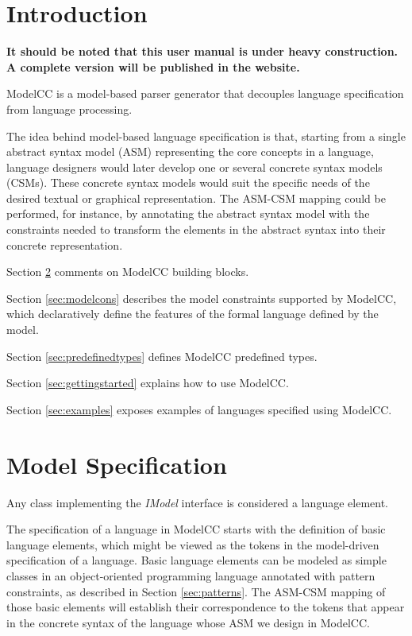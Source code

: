 \documentclass[a4paper,twoside,onecolumn]{article}
\newcommand{\pb}{\newpage}
\newcommand{\empt}{\pb \thispagestyle{empty} \rule[0mm]{0mm}{0mm} \pb}
\begin{document}


\pagestyle{empty}

\tableofcontents

\cleardoublepage

\pagestyle{fancy}

\newpage
\section{Introduction} 

{\bf \color{red} It should be noted that this user manual is under heavy construction. A complete version will be published in the website.}

ModelCC is a model-based parser generator that decouples language specification from language processing.

The idea behind model-based language specification is that, starting from a single abstract syntax model (ASM) representing the core concepts in
a language, language designers would later develop one or several concrete syntax models (CSMs). These concrete syntax models would suit the
specific needs of the desired textual or graphical representation. The ASM-CSM mapping could be performed, for instance, by annotating the
abstract syntax model with the constraints needed to transform the elements in the abstract syntax into their concrete representation.


Section \ref{sec:modelspec} comments on ModelCC building blocks.

Section \ref{sec:modelcons} describes the model constraints supported by ModelCC, which declaratively define the features of the formal language defined by the model.

Section \ref{sec:predefinedtypes} defines ModelCC predefined types.

Section \ref{sec:gettingstarted} explains how to use ModelCC.

Section \ref{sec:examples} exposes examples of languages specified using ModelCC.

\section{Model Specification} \label{sec:modelspec}

Any class implementing the \emph{IModel} interface is considered a language element.

The specification of a language in ModelCC starts with the definition of basic language elements, which might be viewed as the tokens in the model-driven specification of a language.
Basic language elements can be modeled as simple classes in an object-oriented programming language annotated with pattern constraints, as described in Section \ref{sec:patterns}.
The ASM-CSM mapping of those basic elements will establish their correspondence to the tokens that appear in the concrete syntax of the language whose ASM we design in ModelCC.
\end{document}
